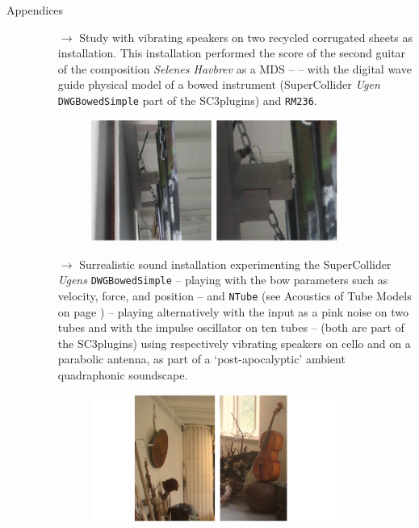 \bigskip

\begin{description}
\item[Appendices] \hfill 
\begin{itemize}
\item[$\rightarrow$] Study with vibrating speakers on two recycled corrugated sheets as installation. This installation performed the score of the second guitar of the composition \textsl{Selenes Havbrev} as a MDS -- \textsl{} -- with the digital wave guide physical model of a bowed instrument (SuperCollider \textsl{Ugen} \texttt{DWGBowedSimple} part of the SC3plugins) and \texttt{RM236}.\\
\vspace{-4mm}
\begin{figure}[H]
\hfill \includegraphics[width=0.85\textwidth]{mp/img/vs1a}
\end{figure}

\item[$\rightarrow$] Surrealistic sound installation experimenting the SuperCollider \textsl{Ugens} \texttt{DWGBowedSimple} -- playing with the bow parameters such as velocity, force, and position --  and \texttt{NTube} (see Acoustics of Tube Models on page \pageref{atm}) -- playing alternatively with the input as a pink noise on two tubes and with the impulse oscillator on ten tubes -- (both are part of the SC3plugins) using respectively vibrating speakers on cello and on a parabolic antenna, as part of a `post-apocalyptic' ambient quadraphonic soundscape.\\
\vspace{-4mm}
\begin{figure}[H]
\hfill \includegraphics[width=0.87\textwidth]{mp/img/asc}
\end{figure}

\end{itemize}
\end{description}
\vspace{-4mm}


